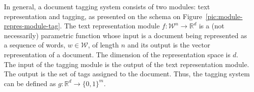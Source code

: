 \documentclass{article}
\renewcommand{\vec}[1]{\boldsymbol{#1}}
\newcommand{\bx}{\vec{x}}
\newcommand{\by}{\vec{y}}
\newcommand{\bw}{\vec{w}}
\newcommand{\calD}{\mathcal{D}}
\newcommand{\calW}{\mathcal{W}}
\newcommand\R{\mathbb{R}}   %
\newcommand{\bc}{\mathbf{c}}
\newcommand{\bd}{\mathbf{d}}
\begin{document}
{In general, a document tagging system consists of two modules: text representation and tagging, as presented on the schema on Figure~\ref{pic:module-repres-module-tag}. The text representation module $f : \calW^{n} \rightarrow \R^{d}$ is a (not necessarily) parametric function whose input is a document being represented as a sequence of words, $w \in \calW$, of length $n$ and its output is the vector representation of a document. The dimension of the representation space is $d$. 
The input of the tagging module is the output of the text representation module. The output is the set of tags assigned to the document. Thus, the tagging system can be defined as $g: \R^{d} \rightarrow  \{ 0 , 1 \}^m$. 


%
%
%
%


}
\end{document}
